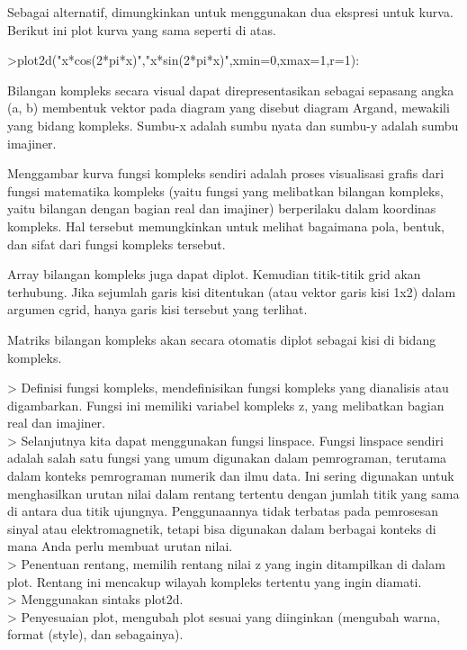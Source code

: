 \documentclass[a4paper,10pt]{article}
\begin{document}
\begin{eulernotebook}
\begin{eulercomment}
\begin{eulercomment}
\begin{eulercomment}
\begin{eulercomment}
\begin{eulercomment}
\begin{eulercomment}
\begin{eulercomment}
Sebagai alternatif, dimungkinkan untuk menggunakan dua ekspresi untuk
kurva. Berikut ini plot kurva yang sama seperti di atas.
\end{eulercomment}
\begin{eulerprompt}
>plot2d("x*cos(2*pi*x)","x*sin(2*pi*x)",xmin=0,xmax=1,r=1):
\end{eulerprompt}
\begin{eulercomment}
Bilangan kompleks secara visual dapat direpresentasikan sebagai
sepasang angka (a, b) membentuk vektor pada diagram yang disebut
diagram Argand, mewakili yang bidang kompleks. Sumbu-x adalah sumbu
nyata dan sumbu-y adalah sumbu imajiner.

Menggambar kurva fungsi kompleks sendiri adalah proses visualisasi
grafis dari fungsi matematika kompleks (yaitu fungsi yang melibatkan
bilangan kompleks, yaitu bilangan dengan bagian real dan imajiner)
berperilaku dalam koordinas kompleks. Hal tersebut memungkinkan untuk
melihat bagaimana pola, bentuk, dan sifat dari fungsi kompleks
tersebut.

Array bilangan kompleks juga dapat diplot. Kemudian titik-titik grid
akan terhubung. Jika sejumlah garis kisi ditentukan (atau vektor garis
kisi 1x2) dalam argumen cgrid, hanya garis kisi tersebut yang
terlihat.

Matriks bilangan kompleks akan secara otomatis diplot sebagai kisi di
bidang kompleks.

\textgreater{} Definisi fungsi kompleks, mendefinisikan fungsi kompleks yang
dianalisis atau digambarkan. Fungsi ini memiliki variabel kompleks z,
yang melibatkan bagian real dan imajiner.\\
\textgreater{} Selanjutnya kita dapat menggunakan fungsi linspace. Fungsi linspace
sendiri adalah salah satu fungsi yang umum digunakan dalam
pemrograman, terutama dalam konteks pemrograman numerik dan ilmu data.
Ini sering digunakan untuk menghasilkan urutan nilai dalam rentang
tertentu dengan jumlah titik yang sama di antara dua titik ujungnya.
Penggunaannya tidak terbatas pada pemrosesan sinyal atau
elektromagnetik, tetapi bisa digunakan dalam berbagai konteks di mana
Anda perlu membuat urutan nilai.\\
\textgreater{} Penentuan rentang, memilih rentang nilai z yang ingin ditampilkan di
dalam plot. Rentang ini mencakup wilayah kompleks tertentu yang ingin
diamati.\\
\textgreater{} Menggunakan sintaks plot2d.\\
\textgreater{} Penyesuaian plot, mengubah plot sesuai yang diinginkan (mengubah
warna, format (style), dan sebagainya).


\end{eulercomment}
\end{eulercomment}
\end{eulercomment}
\end{eulercomment}
\end{eulercomment}
\end{eulercomment}
\end{eulercomment}
\end{eulernotebook}
\end{document}
